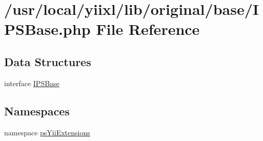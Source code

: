 \hypertarget{IPSBase_8php}{
\section{/usr/local/yiixl/lib/original/base/IPSBase.php File Reference}
\label{IPSBase_8php}
}
\subsection*{Data Structures}
\begin{DoxyCompactItemize}
\item 
interface \hyperlink{interfaceIPSBase}{IPSBase}
\end{DoxyCompactItemize}
\subsection*{Namespaces}
\begin{DoxyCompactItemize}
\item 
namespace \hyperlink{namespacepsYiiExtensions}{psYiiExtensions}
\end{DoxyCompactItemize}
